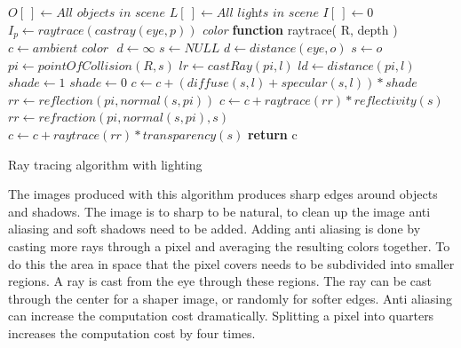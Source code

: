 \documentclass[12pt,a4paper,oneside]{article}
\begin{document}
\begin{algorithm}[H]
\begin{algorithmic}[1]
\STATE $O[\ ] \gets \textit{All objects in scene}$ 
\STATE $L[\ ] \gets \textit{All lights in scene}$
\STATE $I[\ ] \gets 0$ 
\STATE
{}
	\STATE $I_{p} \gets raytrace( castray( eye, p ))$
\ENDFOR
\STATE 
\STATE \textit{color} \textbf{function} raytrace(  R, depth )
	\STATE $c  \gets \textit{ambient color } $
	\STATE $d \gets \infty $
	\STATE $s \gets \textit{NULL}$
				\STATE $d \gets distance( \textit{eye}, o )$
				\STATE $s \gets o$
			\ENDIF
		\ENDIF
	\ENDFOR
		\STATE {}
		\STATE $pi \gets pointOfCollision( R, s )$
			\STATE $lr \gets castRay( pi, l )$
			\STATE $ld \gets distance( pi, l )$
			\STATE $shade \gets 1$
					\STATE $shade \gets 0$				
				\ENDIF
				\STATE $c \gets c +( diffuse( s, l ) + specular( s, l )) * shade$ 
			\ENDFOR
		\ENDFOR
		\STATE {}
			\STATE $rr \gets reflection( pi, normal( s, pi ))$
			\STATE $c \gets c + raytrace( rr ) * reflectivity( s )$
		\ENDIF
		\STATE {}
			\STATE $rr \gets refraction( pi, normal( s, pi ), s )$
			\STATE $c \gets c + raytrace( rr ) * transparency( s )$
		\ENDIF
	\ENDIF
	\STATE \textbf{return} c

\end{algorithmic}
\caption{ Ray tracing algorithm with lighting }
\label{ray-trace-full}
\end{algorithm}

The images produced with this algorithm produces sharp edges around objects and shadows.  The image is to sharp to be natural, to clean up the image anti aliasing and soft shadows need to be added.  Adding anti aliasing is done by casting more rays through a pixel and averaging the resulting colors together.  To do this the area in space that the pixel covers needs to be subdivided into smaller regions.  A ray is cast from the eye through these regions.  The ray can be cast through the center for a shaper image, or randomly for softer edges.  Anti aliasing can increase the computation cost dramatically.  Splitting a pixel into quarters increases the computation cost by four times.
\end{document}
